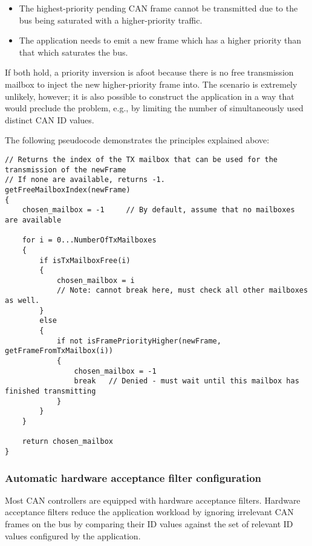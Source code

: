 \begin{itemize}
    \item The highest-priority pending CAN frame cannot be transmitted due to the bus being saturated
    with a higher-priority traffic.
    \item The application needs to emit a new frame which has a higher priority than that which saturates the bus.
\end{itemize}

If both hold, a priority inversion is afoot because there is no free transmission mailbox to
inject the new higher-priority frame into.
The scenario is extremely unlikely, however;
it is also possible to construct the application in a way that would preclude the problem,
e.g., by limiting the number of simultaneously used distinct CAN ID values.

The following pseudocode demonstrates the principles explained above:

\begin{minipage}{0.8\textwidth}
\begin{verbatim}
// Returns the index of the TX mailbox that can be used for the transmission of the newFrame
// If none are available, returns -1.
getFreeMailboxIndex(newFrame)
{
    chosen_mailbox = -1     // By default, assume that no mailboxes are available

    for i = 0...NumberOfTxMailboxes
    {
        if isTxMailboxFree(i)
        {
            chosen_mailbox = i
            // Note: cannot break here, must check all other mailboxes as well.
        }
        else
        {
            if not isFramePriorityHigher(newFrame, getFrameFromTxMailbox(i))
            {
                chosen_mailbox = -1
                break   // Denied - must wait until this mailbox has finished transmitting
            }
        }
    }

    return chosen_mailbox
}
\end{verbatim}
\end{minipage}

\subsubsection{Automatic hardware acceptance filter configuration}

Most CAN controllers are equipped with hardware acceptance filters.
Hardware acceptance filters reduce the application workload by ignoring irrelevant CAN frames on the bus
by comparing their ID values against the set of relevant ID values configured by the application.

